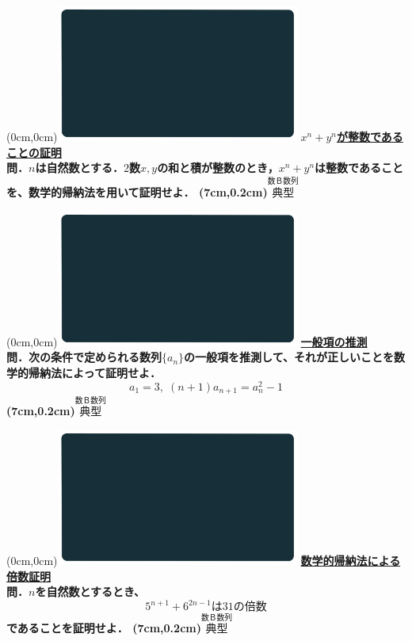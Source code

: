 \documentclass[10pt,
fleqn,
dvipdfmx,
uplatex
]{jsarticle}
\begin{document}
\newpage



\at(0cm,0cm){\includegraphics[width=8cm,bb=0 0 1920 1080]{./media_local/smart_background/数B数列.jpeg}}
{\color{orange}\bf\boldmath\large\underline{$x^n+y^n$が整数であることの証明}}\vspace{0.3zw}\\
\Large 
\bf\boldmath 問．$n$は自然数とする．$2$数$x,y$の和と積が整数のとき，$x^n+y^n$は整数であることを、数学的帰納法を用いて証明せよ．
\at(7cm,0.2cm){\small\color{bradorange}$\overset{\text{数Ｂ数列}}{\text{典型}}$}


\newpage



\at(0cm,0cm){\includegraphics[width=8cm,bb=0 0 1920 1080]{./media_local/smart_background/数B数列.jpeg}}
{\color{orange}\bf\boldmath\Large\underline{一般項の推測}}\vspace{0.3zw}\\
\large 
\bf\boldmath 問．次の条件で定められる数列$\{a_n\}$の一般項を推測して、それが正しいことを数学的帰納法によって証明せよ．
\[a_1=3,\;\left(n+1\right)a_{n+1}=a_n^2-1\]
\at(7cm,0.2cm){\small\color{bradorange}$\overset{\text{数Ｂ数列}}{\text{典型}}$}


\newpage



\at(0cm,0cm){\includegraphics[width=8cm,bb=0 0 1920 1080]{./media_local/smart_background/数B数列.jpeg}}
{\color{orange}\bf\boldmath\Large\underline{数学的帰納法による倍数証明}}\vspace{0.3zw}\\
\Large 
\bf\boldmath 問．$n$を自然数とするとき、
\[5^{n+1}+6^{2n-1}は{31}の倍数\]
であることを証明せよ．
\at(7cm,0.2cm){\small\color{bradorange}$\overset{\text{数Ｂ数列}}{\text{典型}}$}
\end{document}

